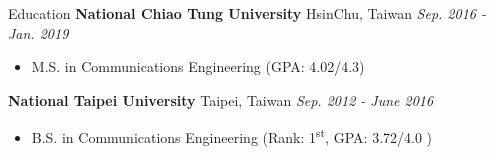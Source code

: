 \documentclass{resume} %
\newcommand{\ts}{\textsuperscript}
\begin{document}

\begin{rSection}{Education}
{\bf National Chiao Tung University} \hfill {HsinChu, Taiwan} \hfill {\em Sep. 2016 - Jan. 2019}
\begin{itemize} \item {M.S. in Communications Engineering (GPA: 4.02/4.3)} \end{itemize}
{\bf National Taipei University} \hfill {Taipei, Taiwan} \hfill {\em Sep. 2012 - June 2016}
\begin{itemize} \item {B.S. in Communications Engineering (Rank: 1\ts{st}, GPA: 3.72/4.0 )} \end{itemize}
\end{rSection}

\end{document}
